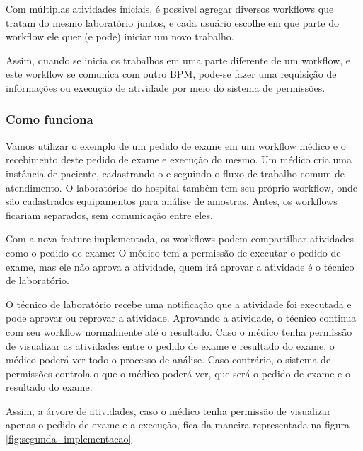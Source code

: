 Com múltiplas atividades iniciais, é possível agregar diversos workflows que tratam do mesmo laboratório juntos, e cada usuário escolhe em que parte do workflow ele quer (e pode) iniciar um novo trabalho.

Assim, quando se inicia os trabalhos em uma parte diferente de um workflow, e este workflow se comunica com outro BPM, pode-se fazer uma requisição de informações ou execução de atividade por meio do sistema de permissões.

\subsubsection{Como funciona}

Vamos utilizar o exemplo de um pedido de exame em um workflow médico e o recebimento deste pedido de exame e execução do mesmo.
Um médico cria uma instância de paciente, cadastrando-o e seguindo o fluxo de trabalho comum de atendimento.
O laboratórios do hospital também tem seu próprio workflow, onde são cadastrados equipamentos para análise de amostras.
Antes, os workflows ficariam separados, sem comunicação entre eles.

Com a nova feature implementada, os workflows podem compartilhar atividades como o pedido de exame: O médico tem a permissão de executar o pedido de exame, mas ele não aprova a atividade, quem irá aprovar a atividade é o técnico de laboratório.

O técnico de laboratório recebe uma notificação que a atividade foi executada e pode aprovar ou reprovar a atividade.
Aprovando a atividade, o técnico continua com seu workflow normalmente até o resultado.
Caso o médico tenha permissão de visualizar as atividades entre o pedido de exame e resultado do exame, o médico poderá ver todo o processo de análise.
Caso contrário, o sistema de permissões controla o que o médico poderá ver, que será o pedido de exame e o resultado do exame.

Assim, a árvore de atividades, caso o médico tenha permissão de visualizar apenas o pedido de exame e a execução, fica da maneira representada na figura \ref{fig:segunda_implementacao}

